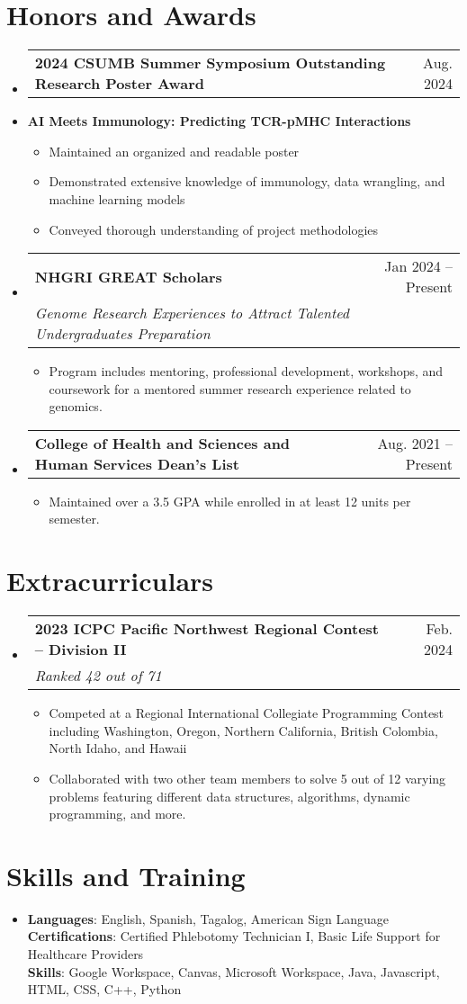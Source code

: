 \documentclass[letterpaper,11pt]{article}
\makeatletter
\newcommand{\resumeItem}[1]{
  \item\small{
    {#1 \vspace{-2pt}}
  }
}
\newcommand{\resumeSubheading}[4]{
  \vspace{-2pt}\item
    \begin{tabular*}{0.97\textwidth}[t]{l@{\extracolsep{\fill}}r}
      \textbf{#1} & #2 \\
      \textit{\small#3} & \textit{\small #4} \\
    \end{tabular*}\vspace{-7pt}
}
\newcommand{\resumeSimpleSubheading}[2]{
  \vspace{-2pt}\item
    \begin{tabular*}{0.97\textwidth}[t]{l@{\extracolsep{\fill}}r}
      \textbf{#1} & #2 \\
    \end{tabular*}\vspace{-7pt}
}
\newcommand{\resumeSubHeadingListStart}{\begin{itemize}[leftmargin=0.15in, label={}]}
\newcommand{\resumeSubHeadingListEnd}{\end{itemize}}
\newcommand{\resumeItemListStart}{\begin{itemize}}
\newcommand{\resumeItemListEnd}{\end{itemize}\vspace{-5pt}}
\makeatother
\begin{document}
\section{Honors and Awards}
  \resumeSubHeadingListStart
    \resumeSimpleSubheading
        {2024 CSUMB Summer Symposium Outstanding Research Poster Award}{Aug. 2024}
    \resumeItem{\textbf{{AI Meets Immunology: Predicting TCR-pMHC Interactions}}}
    \resumeItemListStart
        \resumeItem{Maintained an organized and readable poster}
        \resumeItem{Demonstrated extensive knowledge of immunology, data wrangling, and machine learning models}
        \resumeItem{Conveyed thorough understanding of project methodologies}
    \resumeItemListEnd
    \resumeSubheading
      {NHGRI GREAT Scholars}{Jan 2024 -- Present}
      {Genome Research Experiences to Attract Talented Undergraduates Preparation}{}
      \resumeItemListStart
        \resumeItem{Program includes mentoring, professional development, workshops, and coursework for a mentored summer research experience related to genomics.}
      \resumeItemListEnd
    \resumeSimpleSubheading
      {College of Health and Sciences and Human Services Dean's List}{Aug. 2021 -- Present}
      \resumeItemListStart
        \resumeItem{Maintained over a 3.5 GPA while enrolled in at least 12 units per semester.}
      \resumeItemListEnd
  \resumeSubHeadingListEnd

  \section{Extracurriculars}
    \resumeSubHeadingListStart
        \resumeSubheading
            {2023 ICPC Pacific Northwest Regional Contest -- Division II}{Feb. 2024}
            {Ranked 42 out of 71}{}
        \resumeItemListStart
            \resumeItem{Competed at a Regional International Collegiate Programming Contest including Washington, Oregon, Northern California, British Colombia, North Idaho, and Hawaii}
            \resumeItem{Collaborated with two other team members to solve 5 out of 12 varying problems featuring different data structures, algorithms, dynamic programming, and more.}
        \resumeItemListEnd
    \resumeSubHeadingListEnd

\section{Skills and Training}
 \begin{itemize}[leftmargin=0.15in, label={}]
    \item{
     \textbf{Languages}{: English, Spanish, Tagalog, American Sign Language} \\
     \textbf{Certifications}{: Certified Phlebotomy Technician I, Basic Life Support for Healthcare Providers} \\
     \textbf{Skills}{: Google Workspace, Canvas, Microsoft Workspace, Java, Javascript, HTML, CSS, C++, Python}
    }
  \end{itemize}
    
\end{document}
